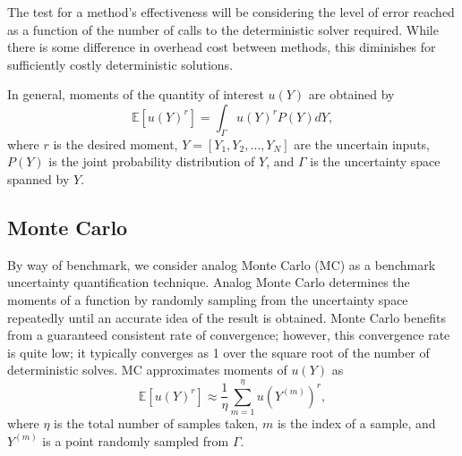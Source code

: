\documentclass[11pt]{article}
\newcommand{\expv}[1]{\ensuremath{\mathbb{E}[ #1]}}
\begin{document}
The test for a method's effectiveness will be considering the level of error reached as a function of the number of calls to the deterministic solver required.  While there is some difference in overhead cost between methods, this diminishes for sufficiently costly deterministic solutions.

In general, moments of the quantity of interest $u(Y)$ are obtained by
\begin{equation}
\expv{u(Y)^r} = \int_\Gamma u(Y)^r P(Y) dY,
\end{equation}
where $r$ is the desired moment, $Y=[Y_1,Y_2,\ldots,Y_N]$ are the uncertain inputs, $P(Y)$ is the joint probability distribution of $Y$, and $\Gamma$ is the uncertainty space spanned by $Y$.

\subsection{Monte Carlo}
By way of benchmark, we consider analog Monte Carlo (MC) as a benchmark uncertainty quantification technique.
Analog Monte Carlo determines the moments of a function by randomly sampling from the uncertainty space repeatedly until an accurate idea of the result is obtained.  Monte Carlo benefits from a guaranteed consistent rate of convergence; however, this convergence rate is quite low; it typically converges as 1 over the square root of the number of deterministic solves.
MC approximates moments of $u(Y)$ as
\begin{equation}
\expv{u(Y)^r}\approx \frac{1}{\eta}\sum_{m=1}^\eta u(Y^{(m)})^r,
\end{equation}
where $\eta$ is the total number of samples taken, $m$ is the index of a sample, and $Y^{(m)}$ is a point randomly sampled from $\Gamma$.
\end{document}
